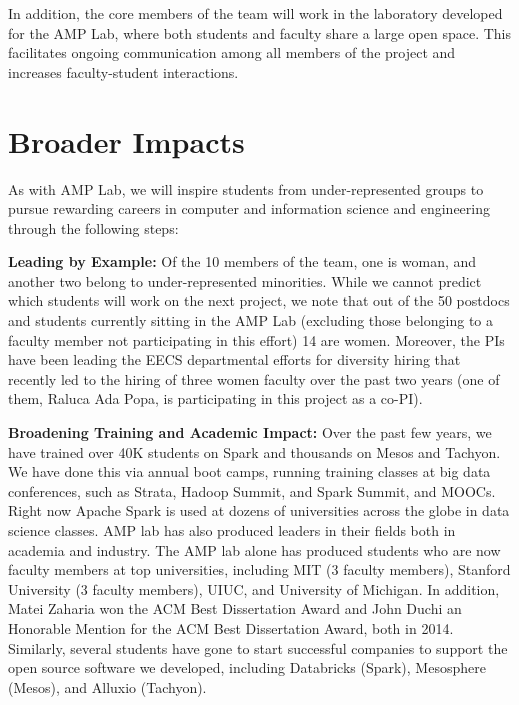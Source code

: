 In addition, the core members of the team will work in the laboratory developed for the AMP Lab, where both students and faculty share a large open space.  This facilitates ongoing communication among all members of the project and increases faculty-student interactions.


\section{Broader Impacts}

As with AMP Lab, we will inspire students from under-represented groups to pursue rewarding careers in computer and information science and engineering through the following steps:

{\bf Leading by Example:} Of the 10 members of the team, one is woman, and another two belong to under-represented minorities.  While we cannot predict which students will work on the next project, we note that out of the 50 postdocs and students currently sitting in the AMP Lab (excluding those belonging to a faculty member not participating in this effort) 14 are women.  Moreover, the PIs have been leading the EECS departmental efforts for diversity hiring that recently led to the hiring of three women faculty over the past two years (one of them, Raluca Ada Popa, is participating in this project as a co-PI).

{\bf Broadening Training and Academic Impact:} Over the past few years, we have trained over 40K students on Spark and thousands on Mesos and Tachyon. We have done this via annual boot camps, running training classes at big data conferences, such as Strata, Hadoop Summit, and Spark Summit, and MOOCs.  Right now Apache Spark is used at dozens of universities across the globe in data science classes. AMP lab has also produced leaders in their fields both in academia and  industry. The AMP lab alone has produced students who are now faculty members at top universities, including MIT (3 faculty members), Stanford University (3 faculty members), UIUC, and University of Michigan. In addition, Matei Zaharia won the ACM Best Dissertation Award and John Duchi an Honorable Mention for the ACM Best Dissertation Award, both in 2014. Similarly, several students have gone to start successful companies to support the open source software we developed, including Databricks (Spark), Mesosphere (Mesos), and Alluxio (Tachyon). 

